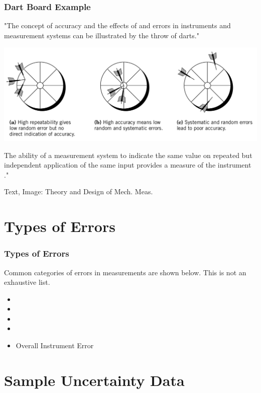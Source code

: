 \documentclass[fleqn]{beamer} %
\newcommand{\sectiontitleII}{Dart Board Example}
\newcommand{\sectiontitleIII}{Types of Errors}
\newcommand{\sectiontitleIV}{Sample Uncertainty Data}
\begin{document}
\begin{frame}[label=sectionIII]
\frametitle{\sectiontitleII}

"The concept of accuracy and the effects of \hspcuu \hspc and \hspcu \hspc errors in instruments
and measurement systems can be illustrated by the throw of darts."

\includegraphics[scale=.20]{dart_throw.png}

The ability of a measurement system to indicate the same value on repeated but independent
application of the same input provides a measure of the instrument \hspcuu \hspc."

{\tiny Text, Image: Theory and Design of Mech. Meas.}
\end{frame}


\section{\sectiontitleIII}

\begin{frame}[label=sectionIII]
\frametitle{\sectiontitleIII}

Common categories of errors in measurements are shown below. This is not an exhaustive list.  

\begin{itemize}
	
	\item 
	\item 
	\item 
	\item 
	\item Overall Instrument Error \vspc
\end{itemize}


\end{frame}

\section{\sectiontitleIV}
\end{document}
